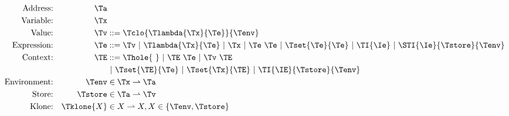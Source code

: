 \begin{figure}[h]
\begin{align*}
\textrm{Address:}     && \Ta          & \\
\textrm{Variable:}    && \Tx          & \\
\textrm{Value:}       && \Tv          & ::= \Tclo{\Tlambda{\Tx}{\Te}}{\Tenv}\\
\textrm{Expression:}  && \Te          & ::=  \Tv
                                        \ |\ \Tlambda{\Tx}{\Te}
                                        \ |\ \Tx
                                        \ |\ \Te\ \Te
                                        \ |\ \Tset{\Te}{\Te}
                                        \ |\ \TI{\Ie}
                                        \ |\ \STI{\Ie}{\Tstore}{\Tenv}\\
\textrm{Context:}     && \TE          & ::=  \Thole{\ }
                                        \ |\ \TE\ \Te
                                        \ |\ \Tv\ \TE\\&&&
                                        \ |\ \Tset{\TE}{\Te}
                                        \ |\ \Tset{\Tx}{\TE}
                                        \ |\ \TI{\IE}{\Tstore}{\Tenv}\\
\textrm{Environment:} && \Tenv        & \in \Tx \rightharpoonup \Ta \\
\textrm{Store:}       && \Tstore      & \in \Ta \rightharpoonup \Tv \\
\textrm{Klone:}       && \Tklone{X}   & \in X \rightharpoonup X, X \in \{\Tenv, \Tstore \} \\
\end{align*}
\end{figure}

